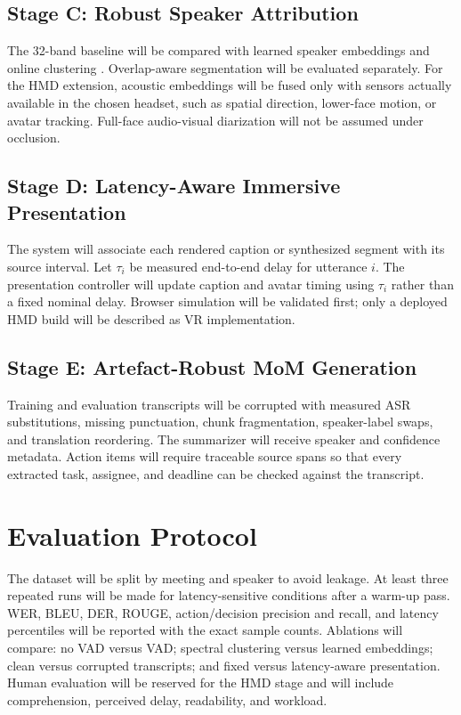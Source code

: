 \documentclass[conference]{IEEEtran}
\begin{document}
\subsection{Stage C: Robust Speaker Attribution}
The 32-band baseline will be compared with learned speaker embeddings and online clustering \cite{coria2024diart}. Overlap-aware segmentation will be evaluated separately. For the HMD extension, acoustic embeddings will be fused only with sensors actually available in the chosen headset, such as spatial direction, lower-face motion, or avatar tracking. Full-face audio-visual diarization will not be assumed under occlusion.

\subsection{Stage D: Latency-Aware Immersive Presentation}
The system will associate each rendered caption or synthesized segment with its source interval. Let $\tau_i$ be measured end-to-end delay for utterance $i$. The presentation controller will update caption and avatar timing using $\tau_i$ rather than a fixed nominal delay. Browser simulation will be validated first; only a deployed HMD build will be described as VR implementation.

\subsection{Stage E: Artefact-Robust MoM Generation}
Training and evaluation transcripts will be corrupted with measured ASR substitutions, missing punctuation, chunk fragmentation, speaker-label swaps, and translation reordering. The summarizer will receive speaker and confidence metadata. Action items will require traceable source spans so that every extracted task, assignee, and deadline can be checked against the transcript.

\section{Evaluation Protocol}
The dataset will be split by meeting and speaker to avoid leakage. At least three repeated runs will be made for latency-sensitive conditions after a warm-up pass. WER, BLEU, DER, ROUGE, action/decision precision and recall, and latency percentiles will be reported with the exact sample counts. Ablations will compare: no VAD versus VAD; spectral clustering versus learned embeddings; clean versus corrupted transcripts; and fixed versus latency-aware presentation. Human evaluation will be reserved for the HMD stage and will include comprehension, perceived delay, readability, and workload.
\end{document}
